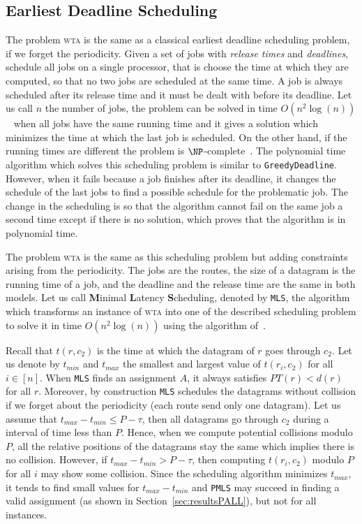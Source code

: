 \documentclass[a4paper,10pt]{article}
\newcommand\greedydeadline{\texttt{GreedyDeadline}\xspace}
\newcommand\MLS{\texttt{MLS}\xspace}
\newcommand\PMLS{\texttt{PMLS}\xspace}
\newcommand\wta{\textsc{wta}\xspace}
\begin{document}
     \subsection{Earliest Deadline Scheduling}\label{sec:wtaheuristic}
     
     
     The problem \wta is the same as a classical earliest deadline scheduling problem, if we forget the periodicity. Given a set of jobs with \emph{release times} and \emph{deadlines}, schedule all jobs on a single processor, that is choose the time at which they are computed, so that no two jobs are scheduled at the same time. A job is always scheduled after its release time and it must be dealt with before its deadline. Let us call $n$ the number of jobs, the problem can be solved in time $O(n^2\log(n))$~\cite{simons1978fast} when all jobs have the same running time and it gives a solution which minimizes the time at which the last job is scheduled. On the other hand, if the running times are different the problem is $\NP$-complete~\cite{lenstra1977complexity}. 
     The polynomial time algorithm which solves this scheduling problem is similar to \greedydeadline. However, when it fails because a job finishes after its deadline, it changes the schedule of the last jobs to find a possible schedule for the problematic job. The change in the scheduling is so that the algorithm cannot fail on the same job a second time except if there is no solution, which proves that the algorithm is in polynomial time.
     
     The problem \wta is the same as this scheduling problem but adding constraints arising from
     the periodicity. The jobs are the routes, the size of a datagram is the running time of a job, 
     and the deadline and the release time are the same in both models.
	 Let us call \textbf{M}inimal \textbf{L}atency \textbf{S}cheduling, denoted by \MLS, the algorithm which transforms an instance of \wta into one of the described scheduling problem to solve it in time $O(n^2\log(n))$ using the algorithm of~\cite{simons1978fast}.
     

    
     Recall that $t(r,c_2)$ is the time at which the datagram of $r$ goes through $c_2$. Let us denote by $t_{min}$ and $t_{max}$ the smallest and largest value of $t(r_i,c_2)$ for all $i \in[n]$. When \MLS finds an assignment $A$, it always satisfies $PT(r) < d(r)$ for all $r$. Moreover, by construction \MLS schedules the datagrams without collision if we forget about the periodicity (each route send only one datagram). Let us assume that $t_{max}- t_{min} \leq P -\tau $, then all datagrams go through $c_2$ during a interval of time less than $P$. Hence, when we compute potential collisions modulo $P$, all the relative positions of the datagrams stay the same which implies there is no collision. However, if $t_{max}- t_{min} > P -\tau $, then computing $t(r_i,c_2)$ modulo $P$ for all $i$ may show some collision. Since the scheduling algorithm minimizes $t_{max}$, it tends to find  small values for $t_{max} - t_{min}$ and \PMLS may succeed in finding a valid assignment (as shown in Section~\ref{sec:resultsPALL}), but not for all instances. 
     
\end{document}
